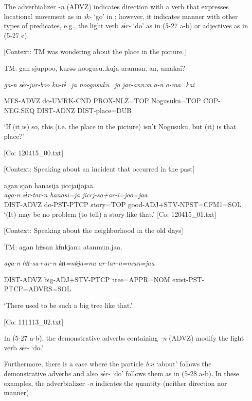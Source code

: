 The adverbializer \textit{{}-n} (ADVZ) indicates direction with a verb that expresses locational movement as in \textit{ik-} ‘go’ in ; however, it indicates manner with other types of predicates, e.g., the light verb \textit{sɨr-} ‘do’ as in (5-27 a-b) or adjectives as in (5-27 c).

\ea \label{ex:5:27}  \ea \label{ex:5:27a} [Context: TM was wondering about the place in the picture.]

    TM:  gan  sjuppoo,  kurəə  noogusu..kuja   arannən,  an,  amakai?

      \textit{ga-n}  \textit{sɨr{}-jur-boo  ku-rɨ=ja  noogusuku=ja} \textit{jar-annən}  \textit{a-n}  \textit{a-ma=kai}
                                                                    
      MES-ADVZ  do-UMRK-CND  PROX-NLZ=TOP  Nogusuku=TOP  COP-NEG.SEQ  DIST-ADNZ  DIST-place=DUB

      ‘If (it is) so, this (i.e. the place in the picture) isn’t Nogusuku, but (it) is that place?’

      [Co: 120415\_00.txt]

 \ex \label{ex:5:b} [Context: Speaking about an incident that occurred in the past]

\glll  agan  sjan  hanasija  jiccjaijojaa.\\
\textit{aga-n}  \textit{sɨr{}-tar-n  hanasi=ja  jiccj-sa+ar-i=joo=jaa}\\
DIST-ADVZ  do-PST-PTCP  story=TOP  good-ADJ+STV-NPST=CFM1=SOL\\
\glt ‘(It) may be no problem (to tell) a story like that.’ [Co: 120415\_01.txt]

 \ex \label{ex:5:c} [Context: Speaking about the neighborhood in the old days]

    TM:  agan  hɨɨsan  kɨnkjanu   atanmun.jaa.

      \textit{aga-n}  \textit{hɨɨ-sa+ar-n}  \textit{kɨɨ=nkja=nu}   \textit{ar-tar-n=mun=jaa}
                                                                  
      DIST-ADVZ  big-ADJ+STV-PTCP  tree=APPR=NOM exist-PST-PTCP=ADVRS=SOL

      ‘There used to be such a big tree like that.’

      [Co: 111113\_02.txt]
\z
\z

In (5-27 a-b), the demonstrative adverbs containing \textit{{}-n} (ADVZ) modify the light verb \textit{sɨr-} ‘do.’

Furthermore, there is a case where the particle \textit{bəi} ‘about’ follows the demonstrative adverbs and also \textit{sɨr-} ‘do’ follows them as in (5-28 a-b). In these examples, the adverbializer \textit{{}-n} indicates the quantity (neither direction nor manner).

